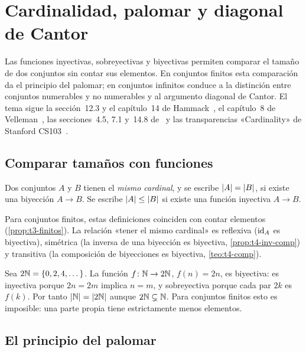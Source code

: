\chapter{Cardinalidad, palomar y diagonal de Cantor}
\label{tema:6}

Las funciones inyectivas, sobreyectivas y biyectivas permiten comparar el tamaño de dos conjuntos sin contar sus elementos. En conjuntos finitos esta comparación da el principio del palomar; en conjuntos infinitos conduce a la distinción entre conjuntos numerables y no numerables y al argumento diagonal de Cantor. El tema sigue la sección~12.3 y el capítulo~14 de Hammack~\cite{hammack}, el capítulo~8 de Velleman~\cite{velleman}, las secciones~4.5, 7.1 y~14.8 de~\cite{mcs} y las transparencias «Cardinality» de Stanford CS103~\cite{cs103card}.

\section{Comparar tamaños con funciones}

\begin{definicion}[Equipotencia]
Dos conjuntos $A$ y $B$ tienen el \emph{mismo cardinal}, y se escribe $\lvert A\rvert=\lvert B\rvert$, si existe una biyección $A\to B$. Se escribe $\lvert A\rvert\le\lvert B\rvert$ si existe una función inyectiva $A\to B$.
\end{definicion}

Para conjuntos finitos, estas definiciones coinciden con contar elementos (\cref{prop:t3-finitos}). La relación «tener el mismo cardinal» es reflexiva ($\mathrm{id}_A$ es biyectiva), simétrica (la inversa de una biyección es biyectiva, \cref{prop:t4-inv-comp}) y transitiva (la composición de biyecciones es biyectiva, \cref{teo:t4-comp}).

\begin{ejemplo}\label{ej:t6-pares}
Sea $2\mathbb{N}=\{0,2,4,\dots\}$. La función $f\colon\mathbb{N}\to2\mathbb{N}$, $f(n)=2n$, es biyectiva: es inyectiva porque $2n=2m$ implica $n=m$, y sobreyectiva porque cada par $2k$ es $f(k)$. Por tanto $\lvert\mathbb{N}\rvert=\lvert2\mathbb{N}\rvert$ aunque $2\mathbb{N}\subsetneq\mathbb{N}$. Para conjuntos finitos esto es imposible: una parte propia tiene estrictamente menos elementos.
\end{ejemplo}

\section{El principio del palomar}

